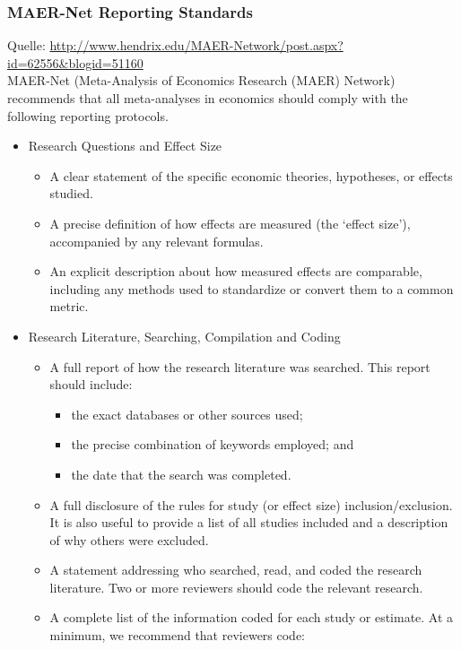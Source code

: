 \begin{frame}[allowframebreaks]\frametitle{MAER-Net Reporting Standards}
  Quelle: \url{http://www.hendrix.edu/MAER-Network/post.aspx?id=62556&blogid=51160}
  \\ \vspace{1ex}
  MAER-Net (Meta-Analysis of Economics Research (MAER) Network) recommends that
  all meta-analyses in economics should comply with the following reporting
  protocols.

\begin{itemize}
\item Research Questions and Effect Size
  \begin{itemize}
  \item A clear statement of the specific economic theories, hypotheses, or
    effects studied.
  \item A precise definition of how effects are measured (the ‘effect size’),
    accompanied by any relevant formulas.
  \item An explicit description about how measured effects are comparable,
    including any methods used to standardize or convert them to a common
    metric.
  \end{itemize}
\item Research Literature, Searching, Compilation and Coding
  \begin{itemize}
  \item A  full report of how the research literature was searched.  This report should include:
    \begin{itemize}
    \item the exact databases or other sources used;
    \item the precise combination of keywords employed; and
    \item the date that the search was completed.
    \end{itemize}
  \item A full disclosure of the rules for study (or effect size)
    inclusion/exclusion.  It is also useful to provide a list of all studies
    included and a description of why others were excluded.
  \item A statement addressing who searched, read, and coded the research
    literature. Two or more reviewers should code the relevant research.
  \item A complete list of the information coded for each study or estimate. At
    a minimum, we recommend that reviewers code:
    \begin{itemize}

\end{itemize}
\end{itemize}
\end{itemize}
\end{frame}
